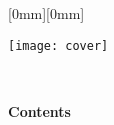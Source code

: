 \documentclass{sight}
\begin{document}
\thispagestyle{empty}
\raisebox{0mm}[0mm][0mm]{%
\parbox{8.5in}{
\vspace*{236mm}\hspace{-32mm}\texttt{[image: cover]}\\
}
}%
\\

\frontmatter
\yesiwantarabic
%

\yesiwantarabic

\newcommand{\briefch}[2]{\noindent\mynormaltype\Large\sffamily{}\ref{ch:#1} & #2 \quad \pageref{ch:#1}\\}
\newcommand{\briefsec}[2]{\noindent\mynormaltype\large \ref{sec:#1} & \large #2 \quad \pageref{sec:#1}\\}
\vfill
\mynormaltype

\onecolumn\pagebreak[4]

\vspace{0mm}
\begin{center}
\noindent\huge\bfseries\sffamily{}Contents\mynormaltype
\end{center}
\vspace{0mm}
\begin{multicols}{2}
  \tableofcontents
  \setcounter{unbalance}{0}
\end{multicols}
\normallayout\onecolumn


\mainmatter
  \addtocounter{page}{12}
\pagebreak[4]\vspace{12mm}
\end{document}
